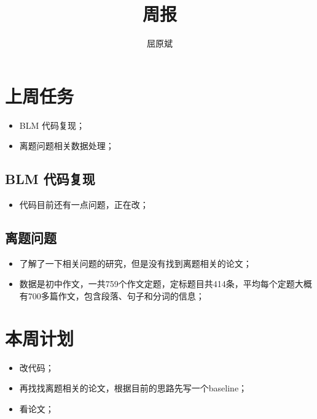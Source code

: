 \documentclass[UTF8]{article}
\title{周报}
\author{屈原斌}
\begin{document}
	\maketitle
	\section{上周任务}
		\begin{itemize}
			\item BLM 代码复现；
			\item 离题问题相关数据处理；
		\end{itemize}

	\subsection{BLM 代码复现}
		\begin{itemize}
			\item 代码目前还有一点问题，正在改；
		\end{itemize}
	\subsection{离题问题}
		\begin{itemize}
			\item 了解了一下相关问题的研究，但是没有找到离题相关的论文；
			\item 数据是初中作文，一共759个作文定题，定标题目共414条，平均每个定题大概有700多篇作文，包含段落、句子和分词的信息；
		\end{itemize}
		
	\section{本周计划}
		\begin{itemize}
			\item 改代码；
			\item 再找找离题相关的论文，根据目前的思路先写一个baseline；
			\item 看论文；
		\end{itemize}
\end{document}

